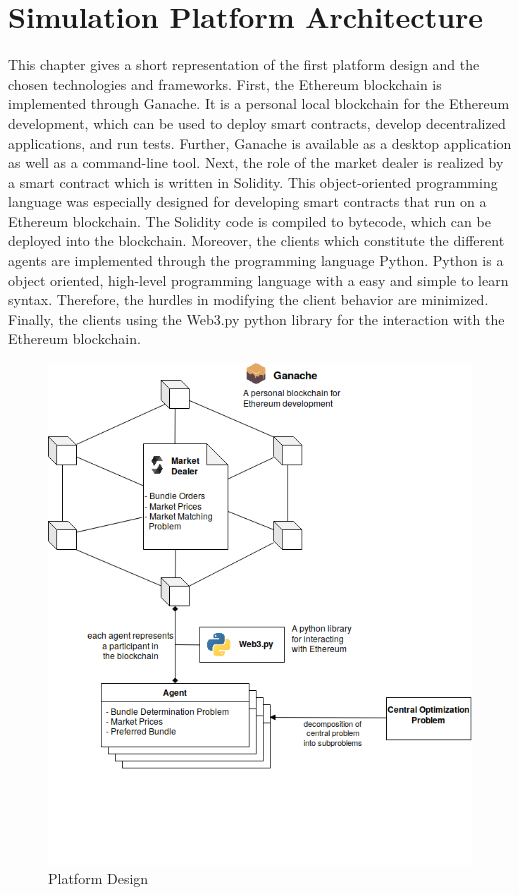\section{Simulation Platform Architecture}
\label{sec:Simulation Platform Architecture}

This chapter gives a short representation of the first platform design and the chosen technologies and frameworks. First, the Ethereum blockchain is implemented through Ganache. It is a personal local blockchain for the Ethereum development, which can be used to deploy smart contracts, develop decentralized applications, and run tests. Further, Ganache is available as a desktop application as well as a command-line tool. Next, the role of the market dealer is realized by a smart contract which is written in Solidity. This object-oriented programming language was especially designed for developing smart contracts that run on a Ethereum blockchain. The Solidity code is compiled to bytecode, which can be deployed into the blockchain. Moreover, the clients which constitute the different agents are implemented through the programming language Python. Python is a object oriented, high-level programming  language with a easy and simple to learn syntax. Therefore, the hurdles in modifying the client behavior are minimized. Finally, the clients using the Web3.py python library for the interaction with the Ethereum blockchain. 

\begin{figure}[htbp]
	\centering
	\includegraphics[width=.75\linewidth]{./figures/platform_architecture.png}
	\caption{Platform Design}
	\label{figure:paltform_architecture}
\end{figure}

\clearpage